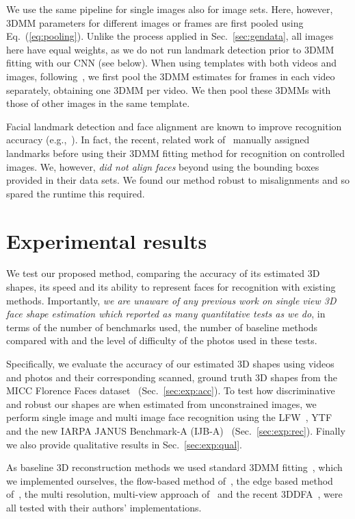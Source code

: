 \documentclass[10pt,twocolumn,letterpaper]{article}
\newcommand{\minisection}[1]{\vspace{1mm}\noindent{\bf #1}}
\begin{document}
We use the same pipeline for single images also for image sets. Here, however, 3DMM parameters for different images or frames are first pooled using Eq.~(\ref{eq:pooling}). Unlike the process applied in Sec.~\ref{sec:gendata}, all images here have equal weights, as we do not run landmark detection prior to 3DMM fitting with our CNN (see below). When using templates with both videos and images, following~\cite{masi16dowe}, we first pool the 3DMM estimates for frames in each video separately, obtaining one 3DMM per video. We then pool these 3DMMs with those of other images in the same template. 

\minisection{Face alignment.} Facial landmark detection and face alignment are known to improve recognition accuracy (e.g.,~\cite{WHT:ECCVW08:DBMW,hassner2015effective}). In fact, the recent, related work of~\cite{hu2016face} manually assigned landmarks before using their 3DMM fitting method for recognition on controlled images. We, however, {\em did not align faces} beyond using the bounding boxes provided in their data sets. We found our method robust to misalignments and so spared the runtime this required. 
\vspace{-2mm}
\section{Experimental results}\label{sec:results}
We test our proposed method, comparing the accuracy of its estimated 3D shapes, its speed and its ability to represent faces for recognition with existing methods. Importantly, {\em we are unaware of any previous work on single view 3D face shape estimation which reported as many quantitative tests as we do}, in terms of the number of benchmarks used, the number of baseline methods compared with and the level of difficulty of the photos used in these tests. 

Specifically, we evaluate the accuracy of our estimated 3D shapes using videos and photos and their corresponding scanned, ground truth 3D shapes from the MICC Florence Faces dataset~\cite{bagdanov11micc} (Sec.~\ref{sec:exp:acc}). To test how discriminative and robust our shapes are when estimated from unconstrained images, we perform single image and multi image face recognition using the LFW~\cite{LFWTech}, YTF~\cite{wolf:YTF} and the new IARPA JANUS Benchmark-A (IJB-A)~\cite{Klare_2015_CVPR} (Sec.~\ref{sec:exp:rec}). Finally we also provide qualitative results in Sec.~\ref{sec:exp:qual}.

As baseline 3D reconstruction methods we used standard 3DMM fitting~\cite{romdhani2005estimating}, which we implemented ourselves, the flow-based method of~\cite{hassner2013viewing}, the edge based method of~\cite{Bas:accvw16}, the multi resolution, multi-view approach of~\cite{huber:3dmm} and the recent 3DDFA~\cite{Zhu2016Face}, were all tested with their authors' implementations. 
\end{document}
